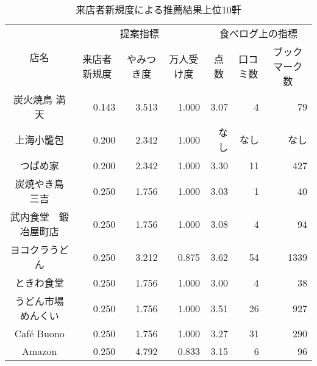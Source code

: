 \begin{table}[H]
\centering
\caption{来店者新規度による推薦結果上位10軒}
\label{table:scrutiny:VN}
\small
\begin{tabular}{|c|r|r|r|r|r|r|}
\hline
\multirow{2}{*}{店名} & \multicolumn{3}{c|}{提案指標} & \multicolumn{3}{c|}{食べログ上の指標} \\ \cline{2-7}
 & \multicolumn{1}{c|}{来店者新規度} & \multicolumn{1}{c|}{やみつき度} & \multicolumn{1}{c|}{万人受け度} & \multicolumn{1}{c|}{点数} & \multicolumn{1}{c|}{口コミ数} & \multicolumn{1}{c|}{ブックマーク数} \\ \hline
炭火焼鳥 満天 & 0.143 & 3.513 & 1.000 & 3.07 & 4 & 79 \\ \hline
上海小籠包 & 0.200 & 2.342 & 1.000 & なし & なし & なし \\ \hline
つばめ家 & 0.200 & 2.342 & 1.000 & 3.30 & 11 & 427 \\ \hline
炭焼やき鳥 三吉 & 0.250 & 1.756 & 1.000 & 3.03 & 1 & 40 \\ \hline
武内食堂　鍛冶屋町店 & 0.250 & 1.756 & 1.000 & 3.08 & 4 & 94 \\ \hline
ヨコクラうどん & 0.250 & 3.212 & 0.875 & 3.62 & 54 & 1339 \\ \hline
ときわ食堂 & 0.250 & 1.756 & 1.000 & 3.00 & 4 & 38 \\ \hline
うどん市場 めんくい & 0.250 & 1.756 & 1.000 & 3.51 & 26 & 927 \\ \hline
Café Buono & 0.250 & 1.756 & 1.000 & 3.27 & 31 & 290 \\ \hline
Amazon & 0.250 & 4.792 & 0.833 & 3.15 & 6 & 96 \\ \hline
\end{tabular}
\end{table}
